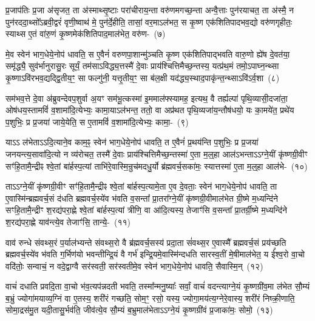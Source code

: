 प्र॒जा\-प॑तिः प्र॒जा अ॑सृजत॒ ता अ॑स्माथ्सृ॒ष्टाः परा॑चीराय॒न्ता वरु॑णमगच्छ॒न्ता अन्वै॒त्ताः पुन॑रयाचत॒ ता अ॑स्मै॒ न पुन॑रददा॒थ्सो᳚\-ऽब्रवी॒द्वरं॑ वृणी॒ष्वाथ॑ मे॒ पुन॑र्दे॒हीति॒ तासां॒ वर॒मा\-ऽल॑भत॒ स कृ॒ष्ण एक॑शितिपादभव॒द्यो वरु॑णगृहीतः॒ स्याथ्स ए॒तं वा॑रु॒णं कृ॒ष्णमेक॑शितिपाद॒मा\-ल॑भेत॒ वरु॑ण-~(७)\ip

मे॒व स्वेन॑ भाग॒धेये॒नोप॑ धावति॒ स ए॒वैनं॑ वरुणपा॒शान्मु॑ञ्चति कृ॒ष्ण एक॑शितिपाद्भवति वारु॒णो ह्ये॑ष दे॒वत॑या॒ समृ॑द्ध्यै॒ सुव॑र्भानुरासु॒रः सूर्यं॒ तम॑सा\-ऽविद्ध्य॒त्तस्मै॑ दे॒वाः प्राय॑श्चित्तिमैच्छ॒न्तस्य॒ यत्प्र॑थ॒मं तमो॒\-ऽपाघ्न॒न्थ्सा कृ॒ष्णा\-ऽवि॑रभव॒द्यद्द्वि॒तीय॒ꣳ॒ सा फल्गु॑नी॒ यत्तृ॒तीय॒ꣳ॒ सा ब॑ल॒क्षी यद॑द्ध्य॒स्थाद॒पाकृ॑न्त॒न्थ्सा\-ऽवि॑\-ऽर्व॒शा~(८)\ip

सम॑भव॒त्ते दे॒वा अ॑ब्रुवन्देवप॒शुर्वा अ॒यꣳ सम॑भू॒त्कस्मा॑ इ॒ममाल॑फ्स्यामह॒ इत्यथ॒ वै तर्ह्यल्पा॑ पृथि॒व्यासी॒दजा॑ता॒ ओष॑धय॒स्तामविं॑ व॒शामा॑दि॒त्येभ्यः॒ कामा॒या\-ऽल॑भन्त॒ ततो॒ वा अप्र॑थत पृथि॒व्यजा॑य॒न्तौष॑धयो॒ यः का॒मये॑त॒ प्रथे॑य प॒शुभिः॒ प्र प्र॒जया॑ जाये॒येति॒ स ए॒तामविं॑ व॒शामा॑दि॒त्येभ्यः॒ कामा॒-~(९)\ip

या\-ऽऽ\- ल॑भेता\-ऽऽ\-दि॒त्याने॒व काम॒ꣴ॒ स्वेन॑ भाग॒धेये॒नोप॑ धावति॒ त ए॒वैनं॑ प्र॒थय॑न्ति प॒शुभिः॒ प्र प्र॒जया॑ जनयन्त्य॒सावा॑दि॒त्यो न व्य॑रोचत॒ तस्मै॑ दे॒वाः प्राय॑श्चित्तिमैच्छ॒न्तस्मा॑ ए॒ता म॒ल्॒\mbox{}हा आल॑\-ऽभन्ता\-ऽऽ\-ग्ने॒यीं कृ॑ष्णग्री॒वीꣳ सꣳ॑हि॒तामै॒न्द्रीꣴ श्वे॒तां बा॑र्\mbox{}हस्प॒त्यां ताभि॑रे॒वास्मि॒न्रुच॑मदधु॒र्यो ब्र॑ह्मवर्च॒सका॑मः॒ स्यात्तस्मा॑ ए॒ता म॒ल्॒\mbox{}हा आल॑भे-~(१०)\ip

ता\-ऽऽ\-ग्ने॒यीं कृ॑ष्णग्री॒वीꣳ सꣳ॑हि॒तामै॒न्द्रीꣴ श्वे॒तां बा॑र्\mbox{}हस्प॒त्या\-मे॒ता ए॒व दे॒वताः॒ स्वेन॑ भाग॒धेये॒नोप॑ धावति॒ ता ए॒वास्मि॑न्ब्रह्मवर्च॒सं द॑धति ब्रह्मवर्च॒स्ये॑व भ॑वति व॒सन्ता᳚ प्रा॒तरा᳚ग्ने॒यीं कृ॑ष्णग्री॒वीमाल॑भेत ग्री॒ष्मे म॒ध्यन्दि॑ने सꣳहि॒तामै॒न्द्रीꣳ श॒रद्य॑परा॒ह्णे श्वे॒तां बा॑र्\mbox{}हस्प॒त्यां त्रीणि॒ वा आ॑दि॒त्यस्य॒ तेजाꣳ॑सि व॒सन्ता᳚ प्रा॒तर्ग्री॒ष्मे म॒ध्यन्दि॑ने श॒रद्य॑परा॒ह्णे याव॑न्त्ये॒व तेजाꣳ॑सि॒ तान्ये॒-~(११)\ip

वाव॑ रुन्धे संवथ्स॒रं प॒र्याल॑भ्यन्ते संवथ्स॒रो वै ब्र॑ह्मवर्च॒सस्य॑ प्रदा॒ता सं॑वथ्स॒र ए॒वास्मै᳚ ब्रह्मवर्च॒सं प्रय॑च्छति ब्रह्मवर्च॒स्ये॑व भ॑वति ग॒र्भिण॑यो भवन्तीन्द्रि॒यं वै गर्भ॑ इन्द्रि॒यमे॒वास्मि॑न्दधति सारस्व॒तीं मे॒षीमा\-ल॑भेत॒ य ई᳚श्व॒रो वा॒चो वदि॑तोः॒ सन्वाचं॒ न वदे॒द्वाग्वै सर॑स्वती॒ सर॑स्वतीमे॒व स्वेन॑ भाग॒धेये॒नोप॑ धावति॒ सैवास्मि॒न्~(१२)\ip

वाचं॑ दधाति प्रवदि॒ता वा॒चो भ॑व॒त्यप॑न्नदती भवति॒ तस्मा᳚न्मनु॒ष्याः᳚ सर्वां॒ वाचं॑ वदन्त्याग्ने॒यं कृ॒ष्णग्री॑व॒मा ल॑भेत सौ॒म्यं ब॒भ्रुं ज्योगा॑मयाव्य॒ग्निं वा ए॒तस्य॒ शरी॑रं गच्छति॒ सोम॒ꣳ॒ रसो॒ यस्य॒ ज्योगा॒मय॑त्य॒ग्नेरे॒वास्य॒ शरी॑रं निष्क्री॒णाति॒ सोमा॒द्रस॑मु॒त यदी॒तासु॒र्भव॑ति॒ जीव॑त्ये॒व सौ॒म्यं ब॒भ्रुमा\-ल॑भेता\-ऽऽ\-ग्ने॒यं कृ॒ष्णग्री॑वं प्र॒जाका॑मः॒ सोमो॒~(१३)\ip

